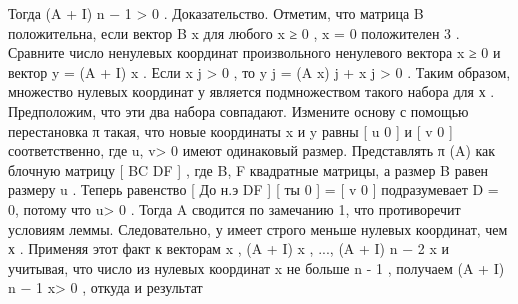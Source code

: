 \documentclass{article} %
\begin{document}
Тогда (A + I) n − 1 > 0 . Доказательство. Отметим, что матрица B положительна, 
если вектор B x для любого x ≥ 0 , x = 0 положителен 3 . 
Сравните число ненулевых координат произвольного ненулевого вектора 
x ≥ 0 и вектор y = (A + I) x . Если x j > 0 , то y j = (A x) j + x j > 0 . 
Таким образом, множество нулевых координат у является 
подмножеством такого набора для х . 
Предположим, что эти два набора совпадают. 
Измените основу с помощью перестановка π такая, 
что новые координаты x и y равны [ u 0 ] и [ v 0 ] соответственно,
где u, v> 0 имеют одинаковый размер. Представлять π (A) 
как блочную матрицу [ BC DF ] , где B, F квадратные матрицы,
а размер B равен размеру u . Теперь равенство [ До н.э DF ] 
[ ты 0 ] = [ v 0 ] подразумевает D = 0, потому что u> 0 . 
Тогда A сводится по замечанию 1, что противоречит условиям леммы.
Следовательно, у имеет строго меньше нулевых координат, 
чем х . Применяя этот факт к векторам x , (A + I) x , ..., (A + I) n − 2 x
 и учитывая, что число из нулевых координат x не больше n - 1 , 
 получаем (A + I) n − 1 x> 0 , откуда и результат
\end{document}
